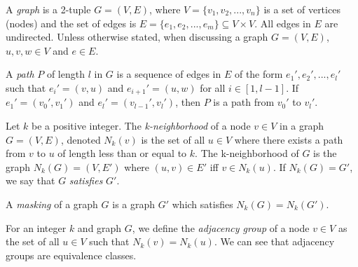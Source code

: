 \begin{dfn}
A \emph{graph} is a 2-tuple $G = (V,E)$, where $V = \{v_1,v_2,...,v_n\}$ is a set of vertices (nodes) and the set of edges is $E = \{e_1,e_2,...,e_m\} \subseteq V \times V$. All edges in $E$ are undirected. Unless otherwise stated, when discussing a graph $G=(V,E)$, $u,v,w \in V$ and $e \in E$. \\
\end{dfn}

\begin{dfn}
 A \emph{path} $P$ of length $l$ in $G$ is a sequence of edges in $E$ of the form $e_1', e_2', ...,e_l'$ such that $e_i' = (v,u)$ and $e_{i+1}' = (u,w)$ for all $i \in [1,l-1]$. If $e_1' = (v_0', v_1')$ and $e_l' = (v_{l-1}', v_l')$, then $P$ is a path from $v_0'$ to $v_l'$. \\
\end{dfn}

\begin{dfn}
Let $k$ be a positive integer. The \emph{k-neighborhood} of a node $v \in V$ in a graph $G = (V,E)$, denoted $N_k(v)$ is the set of all $u \in V$ where there exists a path from $v$ to $u$ of length less than or equal to $k$. The k-neighborhood of $G$ is the graph $N_k(G) = (V, E')$ where $(u,v) \in E'$ iff $v \in N_k(u)$. If $N_k(G) = G'$, we say that $G$ \emph{satisfies} $G'$. \\
\end{dfn}

\begin{dfn}
A \emph{masking} of a graph $G$ is a graph $G'$ which satisfies $N_k(G) = N_k(G')$. \\
\end{dfn}

\begin{dfn}
For an integer $k$ and graph $G$, we define the \emph{adjacency group} of a node $v \in V$ as the set of all $u \in V$ such that $N_k(v) = N_k(u)$. We can see that adjacency groups are equivalence classes. \\
\end{dfn}
